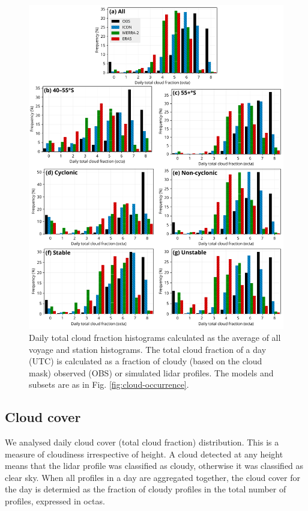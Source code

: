 \documentclass[12pt,a4paper]{article}
\begin{document}
\begin{figure}
\centering
\includegraphics[width=\textwidth]{img/clt_hist.pdf}
\caption{
Daily total cloud fraction histograms calculated as the average of all voyage
and station histograms. The total cloud fraction of a day (UTC) is calculated
as a fraction of cloudy (based on the cloud mask) observed (OBS) or simulated
lidar profiles. The models and subsets are as in Fig.
\ref{fig:cloud-occurrence}.
}
\label{fig:cloud-cover}
\end{figure}

\subsection{Cloud cover}

We analysed daily cloud cover (total cloud fraction) distribution. This is a
measure of cloudiness irrespective of height. A cloud detected at any height
means that the lidar profile was classified as cloudy, otherwise it was
classified as clear sky. When all profiles in a day are aggregated together,
the cloud cover for the day is determied as the fraction of cloudy profiles in
the total number of profiles, expressed in octas.
\end{document}
